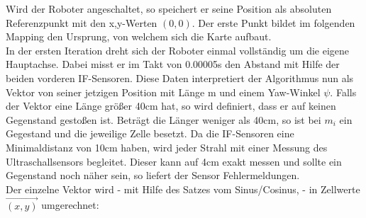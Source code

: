 \documentclass[twoside,11pt, a4paper]{report}
\begin{document}
	Wird der Roboter angeschaltet, so speichert er seine Position als absoluten Referenzpunkt mit den x,y-Werten $(0,0)$. Der erste Punkt bildet im folgenden Mapping den Ursprung, von welchem sich die Karte aufbaut. \\
	In der ersten Iteration dreht sich der Roboter einmal vollständig um die eigene Hauptachse. Dabei misst er im Takt von 0.00005s den Abstand mit Hilfe der beiden vorderen IF-Sensoren. Diese Daten interpretiert der Algorithmus nun als Vektor von seiner jetzigen Position mit Länge m und einem Yaw-Winkel $\psi$. Falls der Vektor eine Länge größer 40cm hat, so wird definiert, dass er auf keinen Gegenstand gestoßen ist. Beträgt die Länger weniger als 40cm, so ist bei $m_i$ ein Gegestand und die jeweilige Zelle besetzt. Da die IF-Sensoren eine Minimaldistanz von 10cm haben, wird jeder Strahl mit einer Messung des Ultraschallsensors begleitet. Dieser kann auf 4cm exakt messen und sollte ein Gegenstand noch näher sein, so liefert der Sensor Fehlermeldungen. \\
	Der einzelne Vektor wird - mit Hilfe des Satzes vom Sinus/Cosinus, \cite{MeWi1999} - in Zellwerte $\vec{(x,y)}$ umgerechnet:
	
\end{document}
